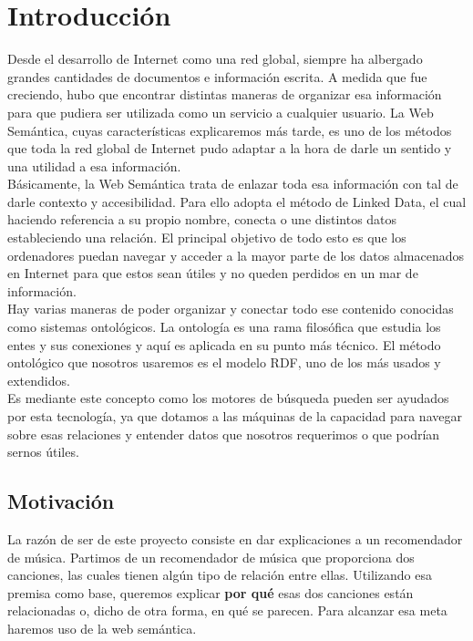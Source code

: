 \chapter{Introducción}
\label{cap:introduccion}

Desde el desarrollo de Internet como una red global, siempre ha albergado grandes cantidades de documentos e información escrita. A medida que fue creciendo, hubo que encontrar distintas maneras de organizar esa información para que pudiera ser utilizada como un servicio a cualquier usuario. La Web Semántica, cuyas características explicaremos más tarde, es uno de los métodos que toda la red global de Internet pudo adaptar a la hora de darle un sentido y una utilidad a esa información.\\

Básicamente, la Web Semántica trata de enlazar toda esa información con tal de darle contexto y accesibilidad. Para ello adopta el método de Linked Data, el cual haciendo referencia a su propio nombre, conecta o une distintos datos estableciendo una relación. El principal objetivo de todo esto es que los ordenadores puedan navegar y acceder a la mayor parte de los datos almacenados en Internet para que estos sean útiles y no queden perdidos en un mar de información.\\

Hay varias maneras de poder organizar y conectar todo ese contenido conocidas como sistemas ontológicos. La ontología es una rama filosófica que estudia los entes y sus conexiones y aquí es aplicada en su punto más técnico. El método ontológico que nosotros usaremos es el modelo RDF, uno de los más usados y extendidos.\\

Es mediante este concepto como los motores de búsqueda pueden ser ayudados por esta tecnología, ya que dotamos a las máquinas de la capacidad para navegar sobre esas relaciones y entender datos que nosotros requerimos o que podrían sernos útiles.\\

\section{Motivación}

La razón de ser de este proyecto consiste en dar explicaciones a un recomendador de música. Partimos de un recomendador de música que proporciona dos canciones, las cuales tienen algún tipo de relación entre ellas. Utilizando esa premisa como base, queremos explicar \textbf{por qué} esas dos canciones están relacionadas o, dicho de otra forma, en qué se parecen. Para alcanzar esa meta haremos uso de la web semántica.\\

